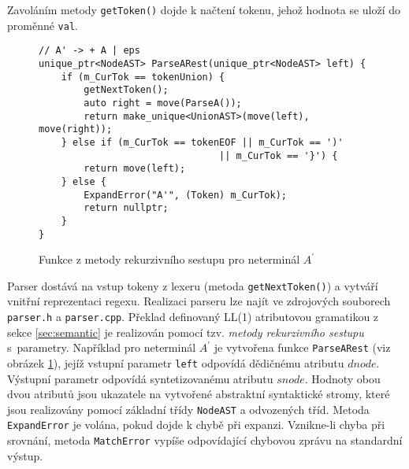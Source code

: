 \documentclass[thesis=B,czech]{FITthesis}[2019/12/23]
\theoremstyle{definition}
\begin{document}
Zavoláním metody \texttt{getToken()} dojde k načtení tokenu, jehož hodnota se uloží do proměnné \texttt{val}. 

\begin{figure}[ht]
	\begin{verbatim}
// A' -> + A | eps
unique_ptr<NodeAST> ParseARest(unique_ptr<NodeAST> left) {
    if (m_CurTok == tokenUnion) {
        getNextToken();
        auto right = move(ParseA());
        return make_unique<UnionAST>(move(left), move(right));
    } else if (m_CurTok == tokenEOF || m_CurTok == ')' 
								|| m_CurTok == '}') {
        return move(left);
    } else {
        ExpandError("A'", (Token) m_CurTok);
        return nullptr;
    }
}
	\end{verbatim}
	\caption{Funkce z metody rekurzivního sestupu pro neterminál $A^\prime$}\label{source:parser}
\end{figure}

Parser dostává na vstup tokeny z lexeru (metoda \texttt{getNextToken()}) a vytváří vnitřní reprezentaci regexu. Realizaci parseru lze najít ve zdrojových souborech \texttt{parser.h} a \texttt{parser.cpp}. Překlad definovaný LL(1) atributovou gramatikou z sekce \ref{sec:semantic} je realizován pomocí tzv. \emph{metody rekurzivního sestupu} s~parametry. Například pro neterminál $A^\prime$ je vytvořena funkce \texttt{ParseARest} (viz obrázek \ref{source:parser}), jejíž vstupní parametr \texttt{left} odpovídá dědičnému atributu $dnode$. Výstupní parametr odpovídá syntetizovanému atributu $snode$. Hodnoty obou dvou atributů jsou ukazatele na vytvořené abstraktní syntaktické stromy, které jsou realizovány pomocí základní třídy \texttt{NodeAST} a odvozených tříd. Metoda \texttt{ExpandError} je volána, pokud dojde k chybě při expanzi. Vznikne-li chyba při srovnání, metoda \texttt{MatchError} vypíše odpovídající chybovou zprávu na standardní výstup.   
\end{document}
